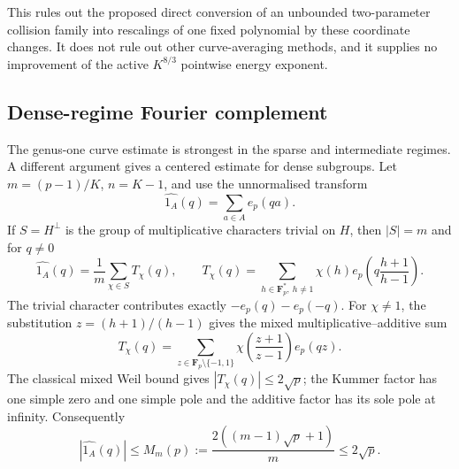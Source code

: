 This rules out the proposed direct conversion of an unbounded two-parameter
collision family into rescalings of one fixed polynomial by these coordinate
changes. It does not rule out other curve-averaging methods, and it supplies
no improvement of the active $K^{8/3}$ pointwise energy exponent.



\subsection{Dense-regime Fourier complement}
\label{subsec:cayley-fourier-hybrid}
The genus-one curve estimate is strongest in the sparse and intermediate
regimes.  A different argument gives a centered estimate for dense subgroups.
Let $m=(p-1)/K$, $n=K-1$, and use the unnormalised transform
\[
 \widehat{1_A}(q)=\sum_{a\in A}e_p(qa).
\]
If $S=H^\perp$ is the group of multiplicative characters trivial on $H$,
then $|S|=m$ and for $q\ne0$
\[
 \widehat{1_A}(q)=\frac1m\sum_{\chi\in S}T_\chi(q),\qquad
 T_\chi(q)=\sum_{h\in\mathbf F_p^*,\ h\ne1}
     \chi(h)e_p\!\left(q\frac{h+1}{h-1}\right).
\]
The trivial character contributes exactly $-e_p(q)-e_p(-q)$.  For
$\chi\ne1$, the substitution $z=(h+1)/(h-1)$ gives the mixed
multiplicative--additive sum
\[
 T_\chi(q)=\sum_{z\in\mathbf F_p\setminus\{-1,1\}}
 \chi\!\left(\frac{z+1}{z-1}\right)e_p(qz).
\]
The classical mixed Weil bound gives $|T_\chi(q)|\le2\sqrt p$; the
Kummer factor has one simple zero and one simple pole and the additive
factor has its sole pole at infinity. Consequently
\begin{equation}\label{eq:cayley-fourier-max}
 |\widehat{1_A}(q)|\le
 M_m(p):=\frac{2((m-1)\sqrt p+1)}m\le2\sqrt p .
\end{equation}

